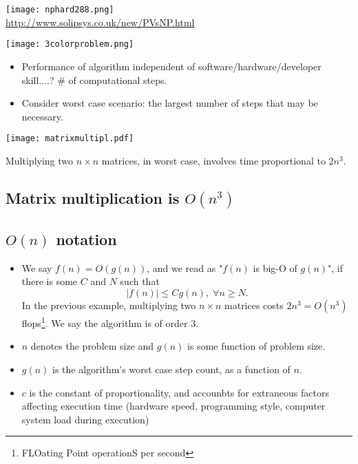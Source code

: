    
      \begin{center}
        \texttt{[image: nphard288.png]}\\
        \footnotesize{\url{http://www.solipsys.co.uk/new/PVsNP.html}}
      \end{center}
   

  \texttt{[image: 3colorproblem.png]}



 
      \begin{itemize}
        \item Performance of algorithm independent of software/hardware/developer skill....? \# of computational steps.
        \item Consider worst case scenario: the largest number of steps that may be necessary.
      \end{itemize}
    
      \begin{center}
        \texttt{[image: matrixmultipl.pdf]}
      \end{center}
      \footnotesize
      Multiplying two $n\times n$ matrices, in worst case, involves time proportional to $2n^3$.
      \normalsize
    




\subsection{Matrix multiplication is $O(n^3)$}
  \begin{footnotesize}
  
\end{footnotesize}


\subsection{$O(n)$ notation}
  \begin{itemize}
    \item We say $f(n)=O(g(n))$, and we read as "$f(n)$ is big-O of $g(n)$", if there is some $C$ and $N$ such that
    \[
      |f(n)| \leq C g(n), \; \forall n\geq N.
    \]
    In the previous example, multiplying two $n \times n$ matrices costs $2n^3=O(n^3)$ flops\footnote{FLOating Point operationS per second}. We say the algorithm is of order 3.
    \item $n$ denotes the problem size and $g(n)$ is some function of problem size.
    \item $g(n)$ is the algorithm's worst case step count, as a function of $n$.
    \item $c$ is the constant of proportionality, and accounbts for extraneous factors affecting execution time (hardware speed, programming style, computer system load during execution)
  \end{itemize}



